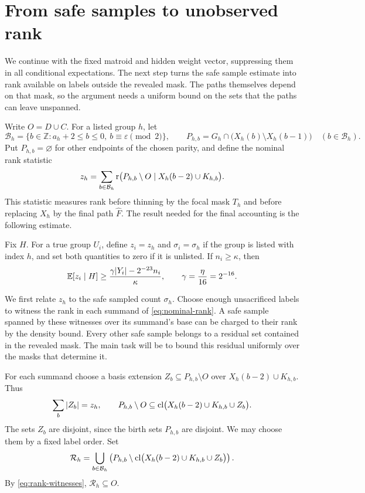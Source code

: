 \section{From safe samples to unobserved rank}\label{sec:transfer}

We continue with the fixed matroid and hidden weight vector, suppressing
them in all conditional expectations.  The next step turns the safe
sample estimate into rank available on labels outside the revealed
mask.  The paths themselves depend on that mask, so the argument needs
a uniform bound on the sets that the paths can leave unspanned.

Write $O=D\cup C$.  For a listed group $h$, let
\[
 \mathcal B_h=\{b\in\mathbb Z:a_h+2\le b\le0,
                              \ b\equiv\varepsilon\pmod 2\},
 \qquad
 P_{h,b}=G_h\cap\bigl(X_h(b)\setminus X_h(b-1)\bigr)
 \quad(b\in\mathcal B_h).
\]
Put $P_{h,b}=\varnothing$ for other endpoints of the chosen parity, and
define the nominal rank statistic
\begin{equation}\label{eq:nominal-rank}
 z_h=\sum_{b\in\mathcal B_h}
 \operatorname{r}\bigl(P_{h,b}\setminus O\mid X_h(b-2)\cup K_{h,b}\bigr).
\end{equation}
This statistic measures rank before thinning by the focal mask $T_h$
and before replacing $X_h$ by the final path $\widehat F$.  The result
needed for the final accounting is the following estimate.

\begin{lemma}\label{lem:transfer}
Fix $H$.  For a true group $U_i$, define $z_i=z_h$ and
$\sigma_i=\sigma_h$ if the group is listed with index $h$, and set
both quantities to zero if it is unlisted.  If $n_i\ge\kappa$, then
\begin{equation}\label{eq:rank-transfer}
 \mathbb E[z_i\mid H]
 \ge\frac{\gamma|Y_i|-2^{-23}n_i}{\kappa},
 \qquad \gamma=\frac\eta{16}=2^{-16}.
\end{equation}
\end{lemma}

We first relate $z_h$ to the safe sampled count $\sigma_h$.  Choose
enough unsacrificed labels to witness the rank in each summand of
\eqref{eq:nominal-rank}.  A safe sample spanned by these witnesses over
its summand's base can be charged to their rank by the density bound.
Every other safe sample belongs to a residual set contained in the
revealed mask.
The main task will be to bound this residual uniformly over the masks
that determine it.

For each summand choose a basis extension
$Z_b\subseteq P_{h,b}\setminus O$ over
$X_h(b-2)\cup K_{h,b}$.  Thus
\begin{equation}\label{eq:rank-witnesses}
 \sum_b|Z_b|=z_h,
 \qquad
 P_{h,b}\setminus O
 \subseteq\operatorname{cl}\bigl(X_h(b-2)\cup K_{h,b}\cup Z_b\bigr).
\end{equation}
The sets $Z_b$ are disjoint, since the birth sets $P_{h,b}$ are
disjoint.  We may choose them by a fixed label order.  Set
\begin{equation}\label{eq:residual-set}
 \mathcal R_h=
 \bigcup_{b\in\mathcal B_h}
 \left(P_{h,b}\setminus
 \operatorname{cl}\bigl(X_h(b-2)\cup K_{h,b}\cup Z_b\bigr)\right).
\end{equation}
By \eqref{eq:rank-witnesses}, $\mathcal R_h\subseteq O$.

